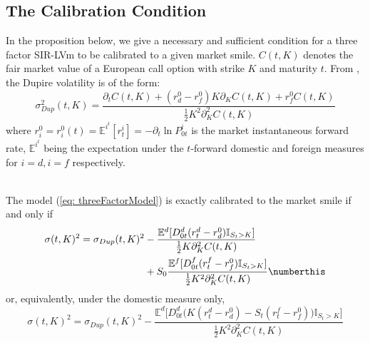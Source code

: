 \subsection{The Calibration Condition}
In the proposition below, we give a necessary and sufficient condition for a three factor SIR-LVm to be calibrated to a given market smile. $C(t,K)$ denotes the fair market value of a European call option with strike $K$ and maturity $t$.
From \cite{deelstraRayee}, the Dupire volatility is of the form:
\begin{equation}\label{eq: threeFactorDupireVolatility}
\sigma_{Dup}^2(t,K) =
\frac{  \partial_t C(t,K) + (r_d^0 - r_f^0)K\partial_K C(t,K)+ r_f^0 C(t,K)}
{ \frac{1}{2}K^2\partial^2_K C(t,K) }
\end{equation}
where $r_i^0 = r_i^0(t)= \mathbb{E}^{i^t} [r^i_t] = -\partial_t\ln P^{i}_{0t}$ is the market instantaneous forward rate, $\mathbb{E}^{i^t}$ being the expectation under the $t$-forward domestic and foreign measures for $i = d, i=f$ respectively.

\begin{prop}\label{prop: calibration}\ \\
The model (\ref{eq: threeFactorModel}) is exactly calibrated to the market smile if and only if
\begin{align*}
\sigma(t,K)^2 = \sigma_{Dup}(t,K)^2 & - \frac{ \mathbb{E}^d[ D_{0t}^d(r_t^d-r^0_d)\mathbb{I}_{S_t>K} ]}{ \frac{1}{2}K\partial^2_KC(t,K) }\\
 &+ S_0\frac{ \mathbb{E}^f[ D_{0t}^f(r_t^f-r^0_f)\mathbb{I}_{S_t>K} ]}{ \frac{1}{2}K^2\partial^2_KC(t,K) }\numberthis \label{eq: threeFactorCalibrationCondition}
\end{align*}
or, equivalently, under the domestic measure only,
\begin{equation}\label{eq: singleMeasure}
\sigma(t,K)^2 = \sigma_{Dup}(t,K)^2 - \frac{ \mathbb{E}^d\big[ D_{0t}^d\big(K(r_t^d-r^0_d)-S_t(r_t^f-r^0_f)\big)\mathbb{I}_{S_t>K} \big]}{ \frac{1}{2}K^2\partial^2_KC(t,K) }
\end{equation}
\end{prop}
